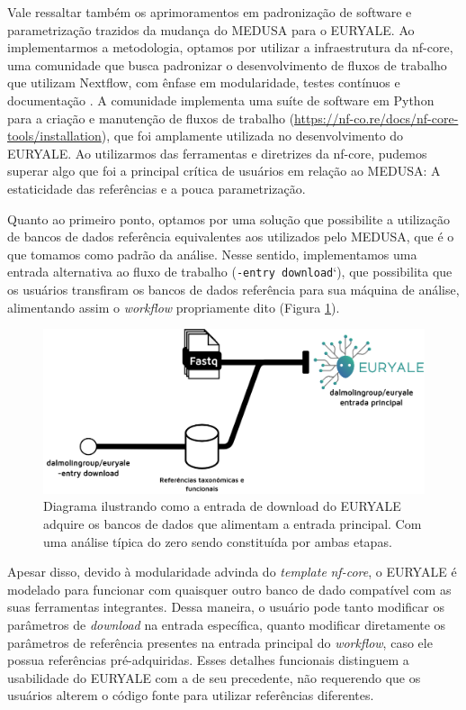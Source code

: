 \documentclass[
	12pt,				%
	oneside,			%
	a4paper,			%
	chapter=TITLE,		%
	section=TITLE,		%
	english,			%
	brazil				%
	]{abntex2}
\begin{document}
Vale ressaltar também os aprimoramentos em padronização de software e parametrização trazidos da mudança do MEDUSA para o EURYALE. Ao implementarmos a metodologia, optamos por utilizar a infraestrutura da nf-core, uma comunidade que busca padronizar o desenvolvimento de fluxos de trabalho que utilizam Nextflow, com ênfase em modularidade, testes contínuos e documentação \autocite{ewels2020}. A comunidade implementa uma suíte de software em Python para a criação e manutenção de fluxos de trabalho (\url{https://nf-co.re/docs/nf-core-tools/installation}), que foi amplamente utilizada no desenvolvimento do EURYALE. Ao utilizarmos das ferramentas e diretrizes da nf-core, pudemos superar algo que foi a principal crítica de usuários em relação ao MEDUSA: A estaticidade das referências e a pouca parametrização.

Quanto ao primeiro ponto, optamos por uma solução que possibilite a utilização de bancos de dados referência equivalentes aos utilizados pelo MEDUSA, que é o que tomamos como padrão da análise. Nesse sentido, implementamos uma entrada alternativa ao fluxo de trabalho (\texttt{-entry\ download}`), que possibilita que os usuários transfiram os bancos de dados referência para sua máquina de análise, alimentando assim o \emph{workflow} propriamente dito (Figura \ref{fig:entries}).
\begin{figure}[H]

{\centering \includegraphics[width=0.7\linewidth]{figure/euryale_entries.drawio} 

}

\caption{Diagrama ilustrando como a entrada de download do EURYALE adquire os bancos de dados que alimentam a entrada principal. Com uma análise típica do zero sendo constituída por ambas etapas.}\label{fig:entries}
\end{figure}
Apesar disso, devido à modularidade advinda do \emph{template} \emph{nf-core}, o EURYALE é modelado para funcionar com quaisquer outro banco de dado compatível com as suas ferramentas integrantes. Dessa maneira, o usuário pode tanto modificar os parâmetros de \emph{download} na entrada específica, quanto modificar diretamente os parâmetros de referência presentes na entrada principal do \emph{workflow}, caso ele possua referências pré-adquiridas. Esses detalhes funcionais distinguem a usabilidade do EURYALE com a de seu precedente, não requerendo que os usuários alterem o código fonte para utilizar referências diferentes.
\end{document}
